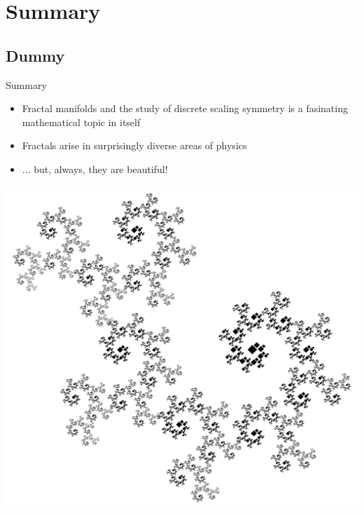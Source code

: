 \documentclass[xcolor=x11names,compress,professionalfonts]{beamer}
\renewcommand{\(}{\begin{columns}}
\renewcommand{\)}{\end{columns}}
\newcommand{\<}[1]{\begin{column}{#1}}
\renewcommand{\>}{\end{column}}
\begin{document}
\section{Summary}
\subsection{Dummy}

\begin{frame}{Summary}

    \begin{itemize}
        \item Fractal manifolds and the study of discrete scaling symmetry is a fasinating mathematical topic in itself
        \item Fractals arise in surprisingly diverse areas of physics
        \item ... but, always, they are beautiful!
    \end{itemize}
    
     {\centering
    	\includegraphics[scale=.15]{dragon.png}
    	
     }
\end{frame}
\end{document}
